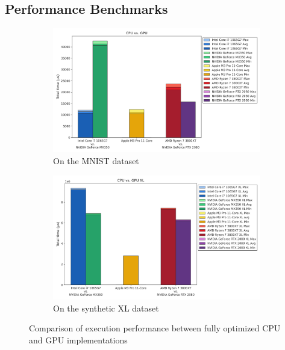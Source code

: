 \documentclass[modern,longauthor]{aastex7}
\begin{document}
\subsection{Performance Benchmarks}
\begin{figure}[htb!]
\centering
\begin{subfigure}{.5\textwidth}
  \centering
  \includegraphics[width=\linewidth]{Graphs/CPU vs. GPU.png}
  \caption{On the MNIST dataset}
\end{subfigure}%
\begin{subfigure}{.5\textwidth}
  \centering
  \includegraphics[width=\linewidth]{Graphs/CPU vs. GPU XL.png}
  \caption{On the synthetic XL dataset}
\end{subfigure}
\caption{Comparison of execution performance between fully optimized CPU and GPU implementations}
\label{fig:cpu-vs-gpu-benchmarks}
\end{figure}
\end{document}
